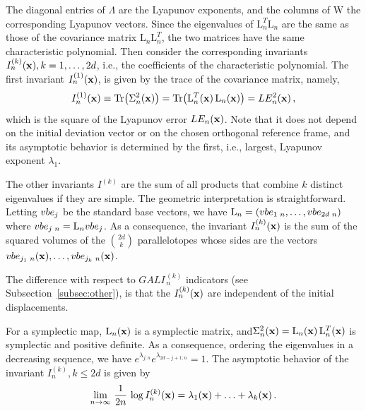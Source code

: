 The diagonal entries of $\Lambda$ are the Lyapunov exponents, and the columns of $\mathrm{W}$ the corresponding Lyapunov vectors. Since the eigenvalues of $\mathrm{L}_n^T\mathrm{L}_n$ are the same as those of the covariance matrix $\mathrm{L}_n\mathrm{L}_n^T$, the two matrices have the same characteristic polynomial. Then consider the corresponding invariants $I_n^{(k)}(\vb{x}), k=1,\ldots,2d$, i.e., the coefficients of the characteristic polynomial. The first invariant $I^{(1)}_n(\vb{x})$, is given by the trace of the covariance matrix, namely,
%
\begin{equation}
  I^{(1)}_n(\vb{x})\equiv \Tr\bigl(\Sigma^2_n(\vb{x})\bigr)= \Tr\bigl(\mathrm{L}_n^T(\vb{x})\,\mathrm{L}_n(\vb{x})\bigr)=LE_n^2(\vb{x}) \,,
   \label{eq2-5}
\end{equation}
%
which is the square of the Lyapunov error $LE_n(\vb{x})$. Note that it does not depend on the initial deviation vector or on the chosen orthogonal reference frame, and its asymptotic behavior is determined by the first, i.e., largest, Lyapunov exponent $\lambda_1$.

The other invariants $I^{(k)}$ are the sum of all products that combine $k$ distinct eigenvalues if they are simple. The geometric interpretation is straightforward. Letting $\\vb{e}_j$ be the standard base vectors, we have $\mathrm{L}_n=(\\vb{e}_{1\,\,n},\ldots,\\vb{e}_{2d\,\,n})$where $\\vb{e}_{j\,\,n}=\mathrm{L}_n\,\\vb{e}_j$. %
As a consequence, the invariant $I_n^{(k)}(\vb{x})$ is the sum of the squared volumes of the $\genfrac(){0pt}{2}{2d}{k}$ parallelotopes whose sides are the vectors $\\vb{e}_{j_1\,\,n}(\vb{x}),\ldots,\\vb{e}_{j_k\,\,n}(\vb{x})$.

The difference with respect to $GALI^{\,(k)}_{\,n}$ indicators (see Subsection~\ref{subsec:other}), is that the $I^{(k)}_n(\vb{x})$ are  independent of the initial displacements. 

For a symplectic map, $\mathrm{L}_n(\vb{x})$ is a symplectic matrix, and$\Sigma^2_n(\vb{x})=\mathrm{L}_n(\vb{x})\,\mathrm{L}_n^T(\vb{x})$ is symplectic and positive definite. As a consequence, ordering the eigenvalues in a decreasing sequence, we have $e^{\lambda_{j;n}}e^{\lambda_{2d-j+1;n}}=1$. The asymptotic behavior of the invariant $I_n^{(k)}, k\le 2d$ is given by 
%
\begin{equation}
  \lim_{n\to \infty}\,\frac{1}{2n}\,\log I^{(k)}_n(\vb{x}) = \lambda_1(\vb{x})+\ldots+\lambda_k(\vb{x}) \, .
  \label{eq2-7}
\end{equation}
%

